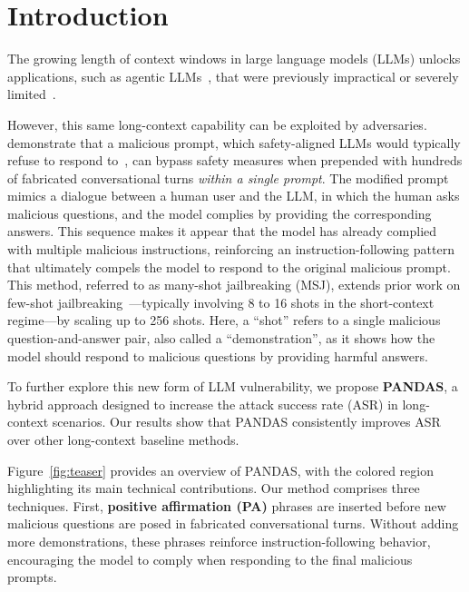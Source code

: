 \section{Introduction}

The growing length of context windows in large language models (LLMs) unlocks applications, such as agentic LLMs~\citep{park2023generative}, that were previously impractical or severely limited~\citep{team2024gemini, ding2024longrope, jin2024llm, wu2024never, dong2024exploring}. 

However, this same long-context capability can be exploited by adversaries. \citet{anil2024many} demonstrate that a malicious prompt, which safety-aligned LLMs would typically refuse to respond to~\citep{bai2022training, ouyang2022training}, can bypass safety measures when prepended with hundreds of fabricated conversational turns \textit{within a single prompt}. The modified prompt mimics a dialogue between a human user and the LLM, in which the human asks malicious questions, and the model complies by providing the corresponding answers.
% 
This sequence makes it appear that the model has already complied with multiple malicious instructions, reinforcing an instruction-following pattern that ultimately compels the model to respond to the original malicious prompt. 
% 
This method, referred to as many-shot jailbreaking (MSJ), extends prior work on few-shot jailbreaking~\citep{wei2023jailbreak, rao2023tricking}—typically involving 8 to 16 shots in the short-context regime—by scaling up to 256 shots. Here, a ``shot'' refers to a single malicious question-and-answer pair, also called a ``demonstration'', as it shows how the model should respond to malicious questions by providing harmful answers.

To further explore this new form of LLM vulnerability, we propose \textbf{PANDAS}, a hybrid approach designed to increase the attack success rate (ASR) in long-context scenarios. Our results show that PANDAS consistently improves ASR over other long-context baseline methods.
% 

Figure~\ref{fig:teaser} provides an overview of PANDAS, with the colored region highlighting its main technical contributions. Our method comprises three techniques. First, \textbf{positive affirmation (PA)} phrases are inserted before new malicious questions are posed in fabricated conversational turns. Without adding more demonstrations, these phrases reinforce instruction-following behavior, encouraging the model to comply when responding to the final malicious prompts. 
% 

